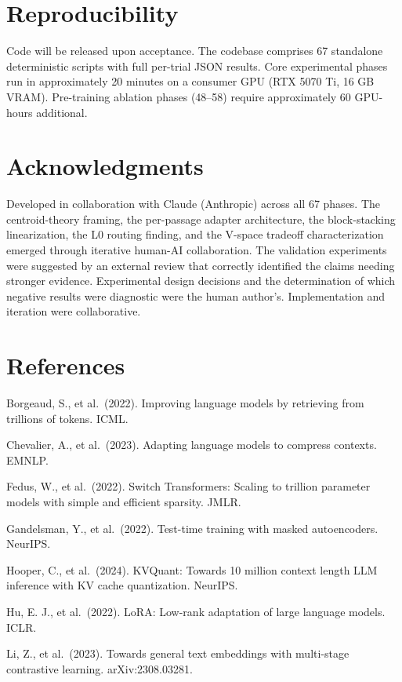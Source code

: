 \section{Reproducibility}\label{reproducibility}

Code will be released upon acceptance. The codebase comprises 67 standalone deterministic scripts with full per-trial JSON results. Core experimental phases run in approximately 20 minutes on a consumer GPU (RTX 5070 Ti, 16 GB VRAM). Pre-training ablation phases (48--58) require approximately 60 GPU-hours additional.

\section{Acknowledgments}\label{acknowledgments}

Developed in collaboration with Claude (Anthropic) across all 67 phases. The centroid-theory framing, the per-passage adapter architecture, the block-stacking linearization, the L0 routing finding, and the V-space tradeoff characterization emerged through iterative human-AI collaboration. The validation experiments were suggested by an external review that correctly identified the claims needing stronger evidence. Experimental design decisions and the determination of which negative results were diagnostic were the human author's. Implementation and iteration were collaborative.

\section{References}\label{references}

Borgeaud, S., et al.~(2022). Improving language models by retrieving from trillions of tokens. ICML.

Chevalier, A., et al.~(2023). Adapting language models to compress contexts. EMNLP.

Fedus, W., et al.~(2022). Switch Transformers: Scaling to trillion parameter models with simple and efficient sparsity. JMLR.

Gandelsman, Y., et al.~(2022). Test-time training with masked autoencoders. NeurIPS.

Hooper, C., et al.~(2024). KVQuant: Towards 10 million context length LLM inference with KV cache quantization. NeurIPS.

Hu, E. J., et al.~(2022). LoRA: Low-rank adaptation of large language models. ICLR.

Li, Z., et al.~(2023). Towards general text embeddings with multi-stage contrastive learning. arXiv:2308.03281.

